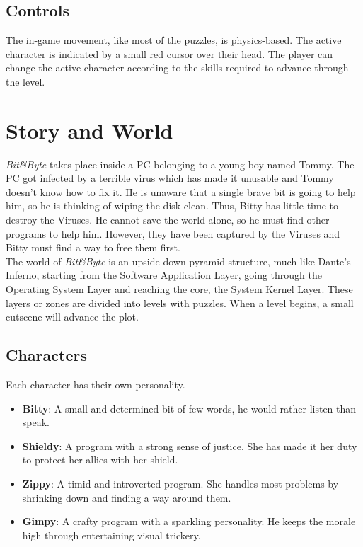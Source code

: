 \documentclass[12pt, a4paper]{report}
\begin{document}
\section*{Controls}
The in-game movement, like most of the puzzles, is physics-based. The active character is indicated by a small red cursor over their head. The player can change the active character according to the skills required to advance through the level.


\chapter{Story and World}
\textit{Bit&Byte} takes place inside a PC belonging to a young boy named Tommy. The PC got infected by a terrible virus which has made it unusable and Tommy doesn’t know how to fix it. He is unaware that a single brave bit is going to help him, so he is thinking of wiping the disk clean. Thus, Bitty has little time to destroy the Viruses. He cannot save the world alone, so he must find other programs to help him. However, they have been captured by the Viruses and Bitty must find a way to free them first.\\
The world of \textit{Bit&Byte} is an upside-down pyramid structure, much like Dante’s Inferno, starting from the Software Application Layer, going through the Operating System Layer and reaching the core, the System Kernel Layer. These layers or zones are divided into levels with puzzles. When a level begins, a small cutscene will advance the plot.

\section*{Characters}
Each character has their own personality.
\begin{itemize}
\item \textbf{Bitty}: A small and determined bit of few words, he would rather listen than speak.
\item \textbf{Shieldy}: A program with a strong sense of justice. She has made it her duty to protect her allies with her shield.
\item \textbf{Zippy}: A timid and introverted program. She handles most problems by shrinking down and finding a way around them.
\item \textbf{Gimpy}: A crafty program with a sparkling personality. He keeps the morale high through entertaining visual trickery.
\end{itemize}
\end{document}
